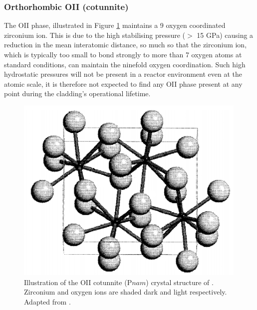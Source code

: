 \subsubsection{Orthorhombic OII (cotunnite)}

The OII phase, illustrated in Figure \ref{fig:cotunnite_structure} maintains a 9 oxygen coordinated zirconium ion. This is due to the high stabilising pressure ($>$ 15 GPa) causing a reduction in the mean interatomic distance, so much so that the zirconium ion, which is typically too small to bond strongly to more than 7 oxygen atoms at standard conditions, can maintain the ninefold oxygen coordination. Such high hydrostatic pressures will not be present in a reactor environment even at the atomic scale, it is therefore not expected to find any OII phase present at any point during the cladding's operational lifetime.

\begin{figure}[htp]
  \centering
      \includegraphics[height=9cm]{images/orthorhombic_II.png}
  \caption[Illustration of the OII cotunnite (P$nam$) crystal structure of \zirconia . Zirconium and oxygen ions are shaded dark and light respectively.]{Illustration of the OII cotunnite (P$nam$) crystal structure of \zirconia . Zirconium and oxygen ions are shaded dark and light respectively. Adapted from \cite{Haines1997}.}
  \label{fig:cotunnite_structure}
\end{figure}



